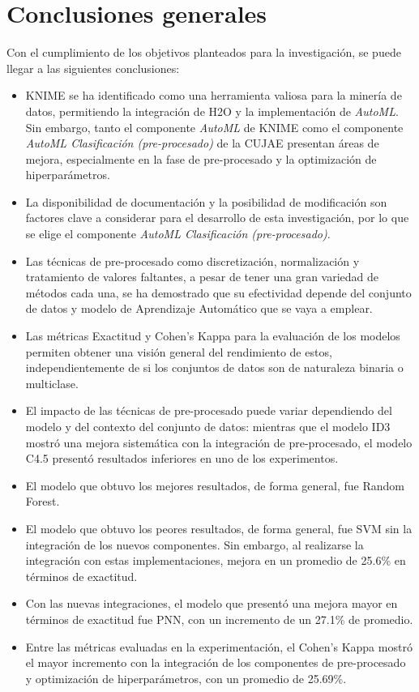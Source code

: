 \chapter*{Conclusiones generales}
Con el cumplimiento de los objetivos planteados para la investigación, se puede llegar a las siguientes conclusiones:
\begin{itemize}
	\item KNIME se ha identificado como una herramienta valiosa para la minería de datos, permitiendo la integración de H2O y la implementación de \textit{AutoML}. Sin embargo, tanto el componente \textit{AutoML} de KNIME como el componente \textit{AutoML Clasificación (pre-procesado)} de la CUJAE presentan áreas de mejora, especialmente en la fase de pre-procesado y la optimización de hiperparámetros.
	\item La disponibilidad de documentación y la posibilidad de modificación son factores clave a considerar para el desarrollo de esta investigación, por lo que se elige el componente \textit{AutoML Clasificación (pre-procesado)}.
	\item Las técnicas de pre-procesado como discretización, normalización y tratamiento de valores faltantes, a pesar de tener una gran variedad de métodos cada una, se ha demostrado que su efectividad depende del conjunto de datos y modelo de Aprendizaje Automático que se vaya a emplear.
	\item Las métricas Exactitud y Cohen's Kappa para la evaluación de los modelos permiten obtener una visión general del rendimiento de estos, independientemente de si los conjuntos de datos son de naturaleza binaria o multiclase.
	\item El impacto de las técnicas de pre-procesado puede variar dependiendo del modelo y del contexto del conjunto de datos: mientras que el modelo ID3 mostró una mejora sistemática con la integración de pre-procesado, el modelo C4.5 presentó resultados inferiores en uno de los experimentos.
	\item El modelo que obtuvo los mejores resultados, de forma general, fue Random Forest.
	\item El modelo que obtuvo los peores resultados, de forma general, fue SVM sin la integración de los nuevos componentes. Sin embargo, al realizarse la integración con estas implementaciones, mejora en un promedio de 25.6\% en términos de exactitud.
	\item Con las nuevas integraciones, el modelo que presentó una mejora mayor en términos de exactitud fue PNN, con un incremento de un 27.1\% de promedio.
	\item Entre las métricas evaluadas en la experimentación, el Cohen’s Kappa mostró el mayor incremento con la integración de los componentes de pre-procesado y optimización de hiperparámetros, con un promedio de 25.69\%.
\end{itemize}